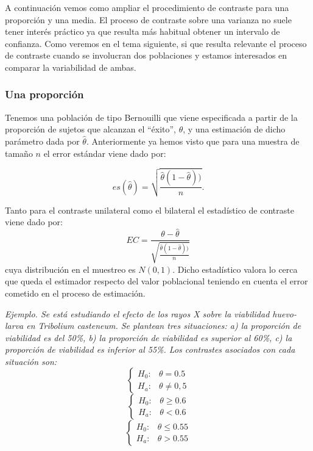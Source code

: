 \documentclass[
]{book}
\begin{document}
A continuación vemos como ampliar el procedimiento de contraste para una proporción y una media. El proceso de contraste sobre una varianza no suele tener interés práctico ya que resulta más habitual obtener un intervalo de confianza. Como veremos en el tema siguiente, si que resulta relevante el proceso de contraste cuando se involucran dos poblaciones y estamos interesados en comparar la variabilidad de ambas.

\hypertarget{una-proporciuxf3n}{%
\subsubsection{Una proporción}\label{una-proporciuxf3n}}

Tenemos una población de tipo Bernouilli que viene especificada a partir de la proporción de sujetos que alcanzan el ``éxito'', \(\theta\), y una estimación de dicho parámetro dada por \(\hat{\theta}\). Anteriormente ya hemos visto que para una muestra de tamaño \(n\) el error estándar viene dado por:

\[es(\hat{\theta}) = \sqrt{\frac{\hat{\theta} (1-\hat{\theta}))}{n}}.\]

Tanto para el contraste unilateral como el bilateral el estadístico de contraste viene dado por: \[EC = \frac{\theta - \hat{\theta}}{\sqrt{\frac{\hat{\theta} (1-\hat{\theta}))}{n}}}\] cuya distribución en el muestreo es \(N(0,1)\). Dicho estadístico valora lo cerca que queda el estimador respecto del valor poblacional teniendo en cuenta el error cometido en el proceso de estimación.

\emph{Ejemplo. Se está estudiando el efecto de los rayos X sobre la viabilidad huevo-larva en Tribolium casteneum. Se plantean tres situaciones: a) la proporción de viabilidad es del 50\%, b) la proporción de viabilidad es superior al 60\%, c) la proporción de viabilidad es inferior al 55\%. Los contrastes asociados con cada situación son:} \[\left\{\begin{array}{ll} H_0: & \theta = 0.5\\ H_a: &  \theta \neq 0,5 \end{array}\right.\] \[\left\{\begin{array}{ll} H_0: & \theta \geq 0.6\\ H_a: & \theta < 0.6 \end{array}\right.\] \[\left\{\begin{array}{ll} H_0: & \theta \leq 0.55\\ H_a: & \theta > 0.55 \end{array}\right.\]
\end{document}
